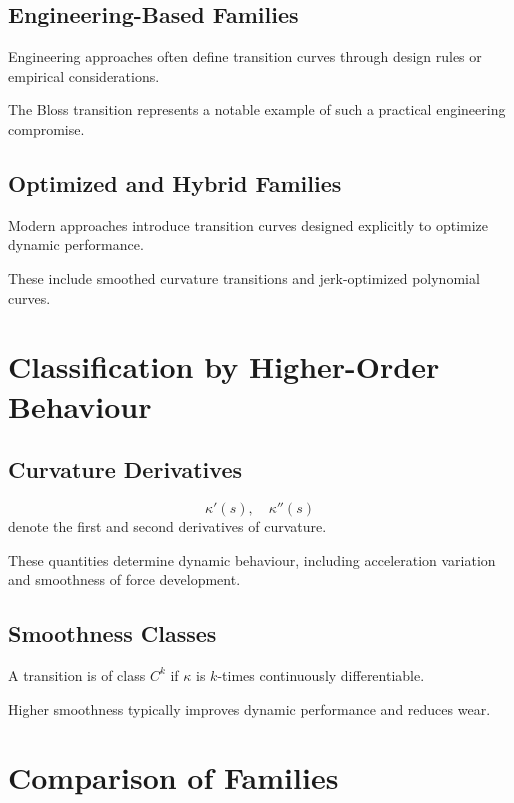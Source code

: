 \subsection{Engineering-Based Families}

Engineering approaches often define transition curves through design
rules or empirical considerations.

The Bloss transition represents a notable example of such a practical
engineering compromise.


\subsection{Optimized and Hybrid Families}

Modern approaches introduce transition curves designed explicitly to
optimize dynamic performance.

These include smoothed curvature transitions and jerk-optimized
polynomial curves.


\section{Classification by Higher-Order Behaviour}

\subsection{Curvature Derivatives}

\begin{definition}
\[
\kappa'(s), \quad \kappa''(s)
\]
denote the first and second derivatives of curvature.
\end{definition}


These quantities determine dynamic behaviour, including acceleration
variation and smoothness of force development.


\subsection{Smoothness Classes}

\begin{definition}
A transition is of class $C^k$ if $\kappa$ is $k$-times continuously
differentiable.
\end{definition}


Higher smoothness typically improves dynamic performance and reduces
wear.


\section{Comparison of Families}

